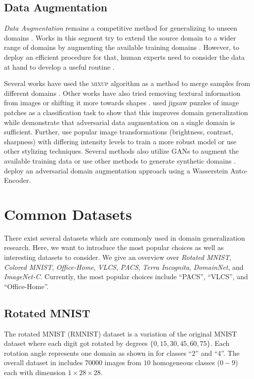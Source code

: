 \subsection{Data Augmentation}
\emph{Data Augmentation} remains a competitive method for generalizing to unseen domains \citep{zhang2019unseen}. Works in this segment try to extend the source domain to a wider range of domains by augmenting the available training domains \citep{huang2020selfchallenging}. However, to deploy an efficient procedure for that, human experts need to consider the data at hand to develop a useful routine \citep{gulrajani2020search}.

Several works have used the \textsc{mixup} \citep{ZhangCDL18} algorithm as a method to merge samples from different domains \citep{XuZNLWTZ20, yan2020improve, WangLK20, mancini2020}. Other works have also tried removing textural information from images \citep{WangHLX19} or shifting it more towards shapes \citep{nam2019reducing, asadi2019shape}. \citet{CarlucciDBCT19} used jigsaw puzzles of image patches as a classification task to show that this improves domain generalization while \citet{VolpiNSDMS18} demonstrate that adversarial data augmentation on a single domain is sufficient. Further, \citet{VolpiM19} use popular image transformations (\eg brightness, contrast, sharpness) with differing intensity levels to train a more robust model or \citet{somavarapu2020frustratingly} use other stylizing techniques. Several methods also utilize GANs to augment the available training data  \citep{RahmanFBS19, ZhouYHX20, ShankarPCCJS18} or use other methods to generate synthetic domains \citep{zhou2020learning}. \citet{QiaoZP20} deploy an adversarial domain augmentation approach using a Wasserstein Auto-Encoder.

\section{Common Datasets}
There exist several datasets which are commonly used in domain generalization research. Here, we want to introduce the most popular choices as well as interesting datasets to consider. We give an overview over \emph{Rotated MNIST}, \emph{Colored MNIST}, \emph{Office-Home}, \emph{VLCS}, \emph{PACS}, \emph{Terra Incognita}, \emph{DomainNet}, and \emph{ImageNet-C}. Currently, the most popular choices include ``PACS'', ``VLCS'', and ``Office-Home''.

\subsection{Rotated MNIST}
The rotated MNIST (RMNIST) dataset \citep{GhifaryKZB15} is a variation of the original MNIST dataset \citep{lecun-mnisthandwrittendigit-2010} where each digit got rotated by degrees $\{0, 15, 30, 45, 60, 75\}$. Each rotation angle represents one domain as shown in  for classes ``2'' and ``4''. The overall dataset in \citet{gulrajani2020search} includes \num{70000} images from $10$ homogeneous classes ($0-9$) each with dimension $1\times28\times28$.

